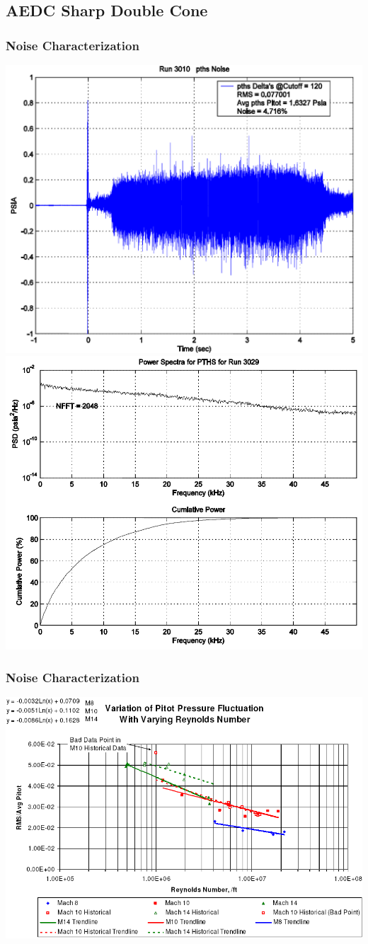 \documentclass[compress,11pt]{beamer}
\begin{document}


\subsection{AEDC Sharp Double Cone}
\frame
{
  \frametitle{\scriptsize Noise Characterization~\cite{mcnalley_AEDC_noise}}
  \begin{center}
    \includegraphics[width=.48\textwidth]{figures/aedc_noise/fluct}
    \includegraphics[width=.48\textwidth]{figures/aedc_noise/spectra}
  \end{center}
}

\frame
{
  \frametitle{\scriptsize Noise Characterization~\cite{mcnalley_AEDC_noise}}
  \vspace{-1em}
  \begin{center}
    \includegraphics[height=.8\textheight]{figures/aedc_noise/noise}
  \end{center}
}
\end{document}
